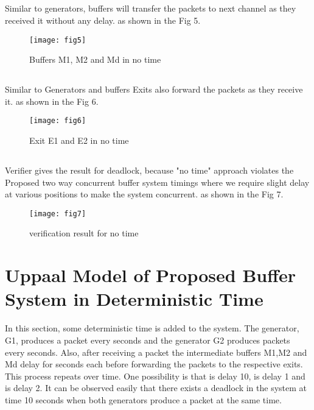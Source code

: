 \documentclass[letterpaper]{article}
\begin{document}
\subsection{} Similar to generators, buffers will transfer the packets to next channel as they received it without any delay. as shown in the Fig 5.
\begin{figure}[bpht!]
\centering
	\texttt{[image: fig5]}
		\caption{Buffers M1, M2 and Md in no time}
	\label{Fig5}
\end{figure}

\subsection{} Similar to Generators and buffers Exits also forward the packets as they receive it. as shown in the Fig 6.
\begin{figure}[bpht!]
\centering
	\texttt{[image: fig6]}
		\caption{Exit E1 and E2 in no time}
	\label{Fig 6}
\end{figure}

\subsection{} Verifier gives the result for deadlock, because "no time" approach violates the Proposed two way concurrent buffer system timings where we require slight delay at various positions to make the system concurrent. as shown in the Fig 7.
\begin{figure}[bpht!]
\centering
	\texttt{[image: fig7]}
		\caption{verification result for no time}
	\label{Fig 7}
\end{figure}



\section{Uppaal Model of Proposed Buffer System in Deterministic Time}
\label{9}
In this section, some deterministic time is added to the system. The generator, G1, produces a packet every  seconds and the generator G2 produces packets every  seconds. Also, after receiving a packet the intermediate buffers M1,M2 and Md delay for  seconds each before forwarding the packets to the respective exits. This process repeats over time. One possibility is that  is delay 10,  is delay 1 and  is delay 2. It can be observed easily that there exists a deadlock in the system at time 10 seconds when both generators produce a packet at the same time.
\end{document}
